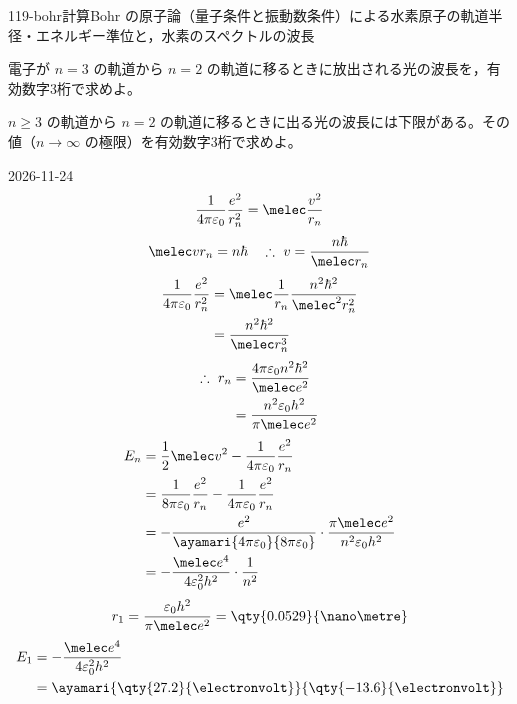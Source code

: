 \documentclass[uplatex,dvipdfmx,a4paper,11pt]{jsarticle}
\begin{document}
\begin{mondai}{119-bohr}{計算}{Bohr の原子論（量子条件と振動数条件）による水素原子の軌道半径・エネルギー準位と，水素のスペクトルの波長}
\begin{shoumon}
    \item 電子が $n=3$ の軌道から $n=2$ の軌道に移るときに放出される光の波長を，有効数字3桁で求めよ。
    \item $n\ge3$ の軌道から $n=2$ の軌道に移るときに出る光の波長には下限がある。その値（$n\to\infty$ の極限）を有効数字3桁で求めよ。
  \end{shoumon}
\begin{kotaeutsushi}{2026-11-24}
\[ \frac{1}{4\pi\varepsilon_{0}}\frac{e^{2}}{r_{n}^{2}}=\melec\frac{v^{2}}{r_{n}} \]
\[ \melec vr_{n}=n\hbar\quad\therefore\ v=\frac{n\hbar}{\melec r_{n}} \]
\begin{align*}
\frac{1}{4\pi\varepsilon_{0}}\frac{e^{2}}{r_{n}^{2}}&=\melec\frac{1}{r_{n}}\frac{n^{2}\hbar^{2}}{\melec^{2}r_{n}^{2}}\\
&=\frac{n^{2}\hbar^{2}}{\melec r_{n}^{3}}
\end{align*}
\begin{align*}
\therefore\ r_{n}&=\frac{4\pi\varepsilon_{0}n^{2}\hbar^{2}}{\melec e^{2}}\\
&=\frac{n^{2}\varepsilon_{0}h^{2}}{\pi\melec e^{2}}
\end{align*}
\begin{align*}
E_{n}&=\frac{1}{2}\melec v^{2}-\frac{1}{4\pi\varepsilon_{0}}\frac{e^{2}}{r_{n}}\\
&=\frac{1}{8\pi\varepsilon_{0}}\frac{e^{2}}{r_{n}}-\frac{1}{4\pi\varepsilon_{0}}\frac{e^{2}}{r_{n}}\\
&=-\frac{e^{2}}{\ayamari{4\pi\varepsilon_{0}}{8\pi\varepsilon_{0}}}\cdot\frac{\pi\melec e^{2}}{n^{2}\varepsilon_{0}h^{2}}\\
&=-\frac{\melec e^{4}}{4\varepsilon_{0}^{2}h^{2}}\cdot\frac{1}{n^{2}}
\end{align*}
\[ r_{1}=\frac{\varepsilon_{0}h^{2}}{\pi\melec e^{2}}=\qty{0.0529}{\nano\metre} \]
\begin{align*}
E_{1}&=-\frac{\melec e^{4}}{4\varepsilon_{0}^{2}h^{2}}\\
&=\ayamari{\qty{27.2}{\electronvolt}}{\qty{-13.6}{\electronvolt}}
\end{align*}

\end{kotaeutsushi}
\end{mondai}
\end{document}
